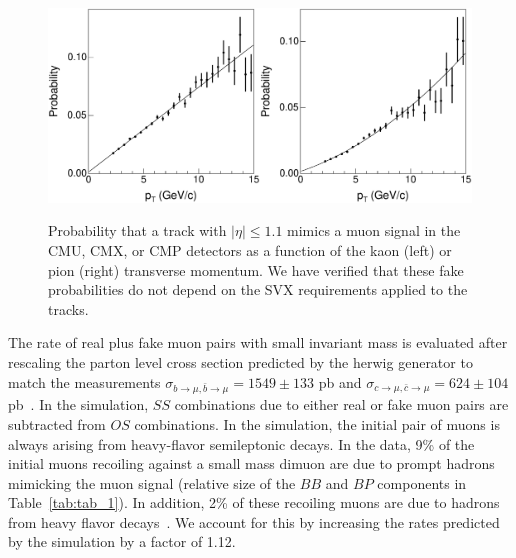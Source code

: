 \documentclass[aps,prd,preprint,floatfix,nofootinbib,superscriptaddress,showpacs,amssymb]{revtex4}
\begin{document}
 \begin{figure}
 \begin{center}
 \vspace{-0.3in}
 \leavevmode
 \includegraphics*[width=0.5\textwidth]{FakeK_CMUXP_VsPtFit.eps}\includegraphics*[width=0.5\textwidth]{FakePi_CMUXP_VsPtFit.eps}
 \caption[]{Probability that a track with $|\eta| \leq 1.1$ mimics a muon 
            signal in the CMU, CMX, or CMP detectors as a function of the
            kaon (left) or pion (right) transverse momentum. We have verified
            that these fake probabilities do not depend on the SVX
            requirements applied to the tracks.}
 \label{fig:fig_6}
 \end{center}
 \end{figure}
 The rate of real plus fake muon pairs with small invariant mass is
 evaluated after rescaling the parton level cross section predicted
 by the {\sc herwig} generator to match the measurements
   $\sigma_{b\rightarrow\mu,\bar{b}\rightarrow \mu}=1549 \pm 133$ pb and
   $\sigma_{c\rightarrow\mu,\bar{c}\rightarrow\mu}=624\pm 104$ pb~\cite{bbxs}.
 In the simulation, $SS$ combinations due to either real or fake muon pairs
 are subtracted from $OS$ combinations. In the simulation, 
 the initial pair of muons is always arising from heavy-flavor semileptonic 
 decays. In the data,  9\% of the initial muons recoiling
 against a small mass dimuon are due to prompt hadrons
 mimicking the muon signal (relative
 size of the $BB$ and $BP$ components in  Table~\ref{tab:tab_1}). 
 In addition, 2\% of these recoiling muons are due to hadrons from 
 heavy flavor decays~\cite{bbxs}. We account for this by increasing the 
 rates predicted by the simulation by a factor of 1.12.
\end{document}
